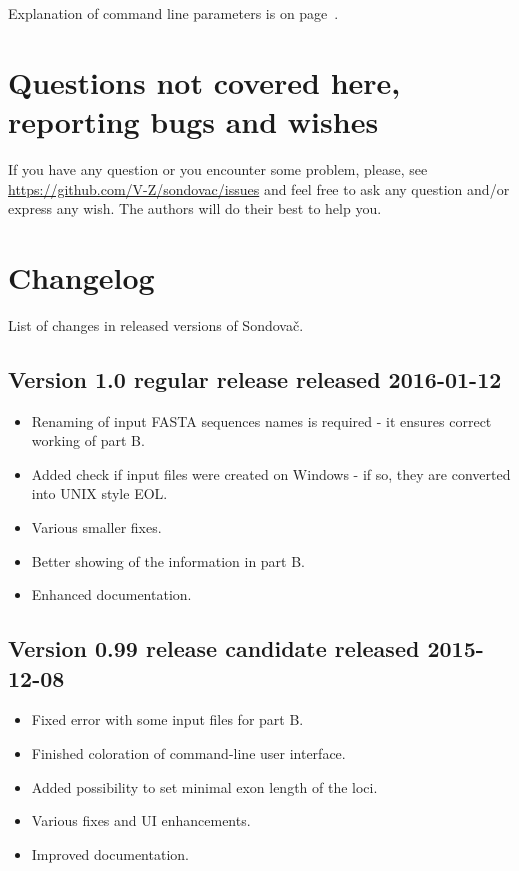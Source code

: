 \documentclass[a4paper, 11pt, twoside]{article}
\begin{document}
Explanation of command line parameters is on page~\pageref{script-usage}.

\section{Questions not covered here, reporting bugs and wishes}

If you have any question or you encounter some problem, please, see \url{https://github.com/V-Z/sondovac/issues} and feel free to ask any question and/or express any wish. The authors will do their best to help you.

\section{Changelog}

List of changes in released versions of Sondovač.

\subsection{Version 1.0 regular release released 2016-01-12}

\begin{itemize}
  \item Renaming of input FASTA sequences names is required - it ensures correct working of part B.
  \item Added check if input files were created on Windows - if so, they are converted into UNIX style EOL.
  \item Various smaller fixes.
  \item Better showing of the information in part B.
  \item Enhanced documentation.
\end{itemize}

\subsection{Version 0.99 release candidate released 2015-12-08}

\begin{itemize}
  \item Fixed error with some input files for part B.
  \item Finished coloration of command-line user interface.
  \item Added possibility to set minimal exon length of the loci.
  \item Various fixes and UI enhancements.
  \item Improved documentation.
\end{itemize}
\end{document}
